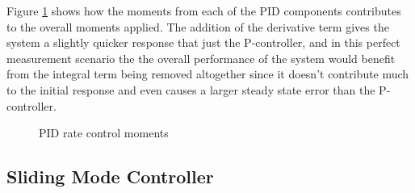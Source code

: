 Figure \ref{fig:PIDRateControlMoments} shows how the moments from each of the PID components contributes to the overall moments applied.  The addition of the derivative term gives the system a slightly quicker response that just the P-controller, and in this perfect measurement scenario the the overall performance of the system would benefit from the integral term being removed altogether since it doesn't contribute much to the initial response and even causes a larger steady state error than the P-controller.
\begin{figure}[H]
  \centerline{}
  \caption{PID rate control moments}
  \label{fig:PIDRateControlMoments}
\end{figure}

\subsection{Sliding Mode Controller}
\label{subsec:SlidingModeController}


